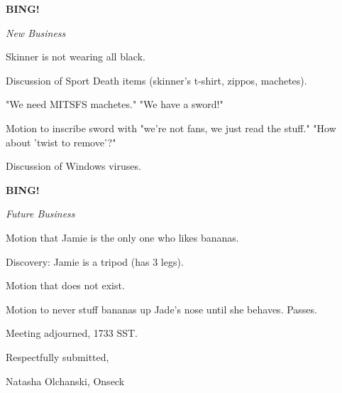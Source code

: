 \documentclass[12pt]{article}
\newcommand{\bing}{{\bf BING!} }
\newcommand{\goto}[1]{\bing \vskip 12pt \centerline{{\em{#1}}}}
\begin{document}
\goto{New Business}

Skinner is not wearing all black.

Discussion of Sport Death items (skinner's t-shirt, zippos, machetes).

"We need MITSFS machetes." "We have a sword!"

Motion to inscribe sword with "we're not fans, we just read the stuff." "How about 'twist to remove'?"

Discussion of Windows viruses.

\goto{Future Business}

Motion that Jamie is the only one who likes bananas.

Discovery: Jamie is a tripod (has 3 legs).

Motion that does not exist.

Motion to never stuff bananas up Jade's nose until she behaves. Passes.

\vspace{12pt}

\noindent
Meeting adjourned, 1733 SST.

\vspace{18pt}

\centerline{Respectfully submitted,}
\centerline{Natasha Olchanski, Onseck}
\end{document}
